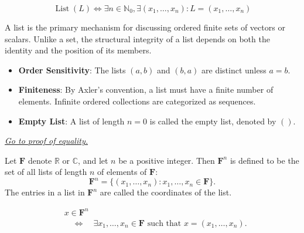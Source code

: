 \begin{remark*}
\[
\operatorname{List}(L) \iff \exists n \in \mathbb{N}_0, \exists (x_1, \dots, x_n) : L = (x_1, \dots, x_n)
\]
\end{remark*}

\begin{remark*}[Interpretation]
A list is the primary mechanism for discussing ordered finite sets of vectors or scalars. Unlike a set, the structural integrity of a list depends on both the identity and the position of its members.
\begin{itemize}
    \item \textbf{Order Sensitivity}: The lists $(a, b)$ and $(b, a)$ are distinct unless $a=b$.
    \item \textbf{Finiteness}: By Axler's convention, a list must have a finite number of elements. Infinite ordered collections are categorized as sequences.
    \item \textbf{Empty List}: A list of length $n=0$ is called the empty list, denoted by $()$.
\end{itemize}
\end{remark*}

\smallskip
\noindent
\hyperref[prf:list-equality]{\textit{Go to proof of equality.}}

\NoLocalDependencies

\begin{tcolorbox}[colback=defbox, colframe=defborder, arc=2pt,
  left=6pt, right=6pt, top=4pt, bottom=4pt,
  title={\small\textbf{Definition ($\mathbf{F}^n$)}},
  fonttitle=\small\bfseries]
\begin{definition}[$\mathbf{F}^n$]
\label{def:Fn}
Let $\mathbf{F}$ denote $\mathbb{R}$ or $\mathbb{C}$, and let $n$ be a positive integer.
Then $\mathbf{F}^n$ is defined to be the set of all lists of length $n$ of elements of $\mathbf{F}$:
\[
\mathbf{F}^n
=
\{(x_1,\dots,x_n) : x_1,\dots,x_n \in \mathbf{F}\}.
\]
The entries in a list in $\mathbf{F}^n$ are called the coordinates of the list.
\end{definition}
\end{tcolorbox}

\begin{remark*}
\[
\begin{aligned}
&x \in \mathbf{F}^n \\
&\quad\Longleftrightarrow\quad
\exists x_1,\dots,x_n \in \mathbf{F}
\text{ such that }
x = (x_1,\dots,x_n).
\end{aligned}
\]
\end{remark*}

